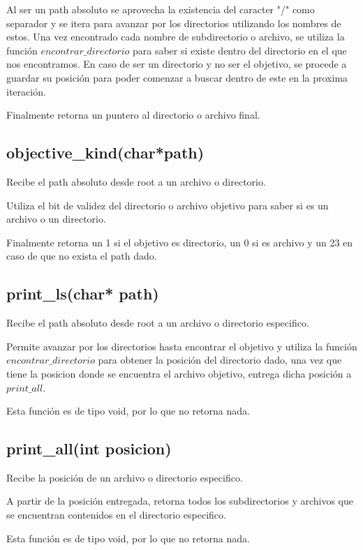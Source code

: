 \documentclass[12pt]{article}
\begin{document}
Al ser un path absoluto se aprovecha la existencia del caracter "/" como separador y se itera para avanzar por los directorios utilizando los nombres de estos. Una vez encontrado cada nombre de subdirectorio o archivo, se utiliza la función $encontrar\_directorio$ para saber si existe dentro del directorio en el que nos encontramos. En caso de ser un directorio y no ser el objetivo, se procede a guardar su posición para poder comenzar a buscar dentro de este en la proxima iteración. 

Finalmente retorna un puntero al directorio o archivo final.

\subsection{objective\_kind(char*path)}
Recibe el path absoluto desde root a un archivo o directorio.

Utiliza el bit de validez del directorio o archivo objetivo para saber si es un archivo o un directorio.

Finalmente retorna un 1 si el objetivo es directorio, un 0 si es archivo y un 23 en caso de que no exista el path dado.

\subsection{print\_ls(char* path)}
Recibe el path absoluto desde root a un archivo o directorio especifico.

Permite avanzar por los directorios hasta encontrar el objetivo y utiliza la función $encontrar\_directorio$ para obtener la posición del directorio dado, una vez que tiene la posicion donde se encuentra el archivo objetivo, entrega dicha posición a $print\_all$.

Esta función es de tipo void, por lo que no retorna nada.

\subsection{print\_all(int posicion)}
Recibe la posición de un archivo o directorio especifico.

A partir de la posición entregada, retorna todos los subdirectorios y archivos que se encuentran contenidos en el directorio especifico.

Esta función es de tipo void, por lo que no retorna nada.

\end{document}
